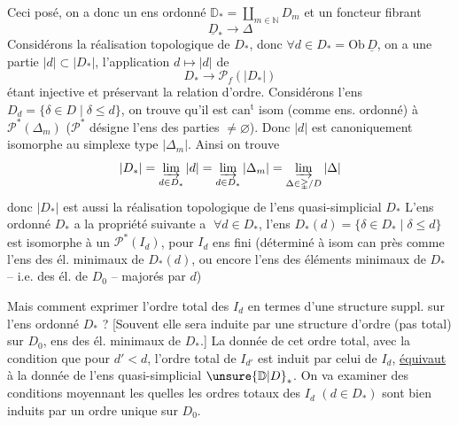 Ceci posé, on a donc un ens ordonné $\mathbb D_*=\coprod_{m\in\mathbb N}D_m$ et un foncteur fibrant
\[
\underline{D}_*\longrightarrow\mathbb{\Delta}
\]
Considérons la réalisation topologique  de $D_*$, donc $\forall d\in D_*=\mathrm{Ob}\,\underline D$, on a une partie  $|d|\subset|D_*|$, l'application $d\longmapsto|d|$ de
\[
D_*\longrightarrow\mathscr P_f(|D_*|)
\]
étant injective et préservant la relation d'ordre.
Considérons  l'ens $D_d=\{\delta\in D\mid\delta\leq d\}$, on trouve qu'il est $\mathrm{can}^{\mathrm t}$ isom (comme ens. ordonné) à $\mathscr P^*(\Delta_m)$ ($\mathscr P^*$ désigne l'ens des parties $\ne\varnothing$).
Donc $|d|$ est canoniquement isomorphe au simplexe type $|\Delta_m|$. Ainsi on trouve
\[
|D_*|=\varinjlim_{d\in D_*}|d|=\varinjlim_{d\in D_*}|\Delta_m|
=\varinjlim_{\Delta\in\mathbb{\Delta}/D}|\Delta|
\]
donc $|D_{*}|$ est aussi la réalisation topologique de l'ens quasi-simplicial $D_*$
L'ens ordonné $D_*$ a la propriété suivante
\textcircled{a} $\forall d\in D_*$, l'ens  $D_*(d)=\{\delta\in D_*\mid\delta\leq d\}$ est isomorphe à un $\mathscr P^*(I_d)$, pour $I_d$ ens fini
(déterminé à isom can près comme l'ens des él. minimaux de $D_*(d)$, ou encore l'ens des éléments minimaux de $D_*$ --  i.e. des él. de $D_0$ -- majorés par $d$)

Mais comment exprimer l'ordre total des $I_d$  en termes d'une structure suppl. sur l'ens ordonné $D_*$ ? [Souvent elle sera induite par une structure d'ordre (pas total) sur $D_0$, ens des él. minimaux de $D_*$.]
La donnée de cet ordre total, avec la condition que pour $d'<d$, l'ordre total de $I_{d'}$ est induit par celui de $I_d$, \uline{équivaut} à la donnée de l'ens quasi-simplicial $\unsure{\mathbb D|D}_*$. On va examiner des
\margin{$\vert\,\vert\,\vert$}conditions  moyennant les quelles les ordres totaux des $I_d$ $(d\in D_*)$ sont bien induits par un ordre unique sur $D_0$.

